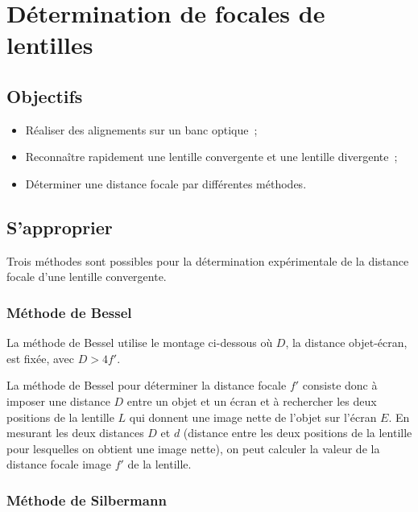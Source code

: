 \documentclass[a4paper, 12pt, final, garamond]{book}
\begin{document}
\setcounter{chapter}{0}

\chapter{D\'etermination de focales de lentilles}

\section{Objectifs}

\begin{itemize}
    \item	Réaliser des alignements sur un banc optique~;
    \item Reconnaître rapidement une lentille convergente et une lentille
        divergente~;
    \item Déterminer une distance focale par différentes méthodes.
\end{itemize}

\section{S'approprier}

Trois méthodes sont possibles pour la détermination expérimentale de la distance
focale d'une lentille convergente.

\subsection{Méthode de Bessel}
	
La méthode de Bessel utilise le montage ci-dessous où $D$, la distance
objet-écran, est fixée, avec $D>4f'$.


La méthode de Bessel pour déterminer la distance focale $f'$ consiste donc à
imposer une distance $D$ entre un objet et un écran et à rechercher les deux
positions de la lentille $L$ qui donnent une image nette de l'objet sur l'écran
$E$. En mesurant les deux distances $D$ et $d$ (distance entre les deux
positions de la lentille pour lesquelles on obtient une image nette), on peut
calculer la valeur de la distance focale image $f'$ de la lentille.

\subsection{Méthode de Silbermann}
\end{document}
